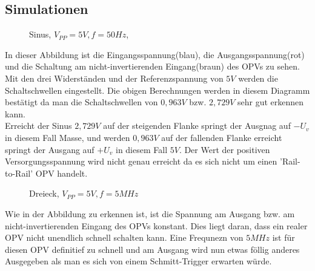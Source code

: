 \subsection{Simulationen}
\begin{figure}[H]
  \centering
  \caption{Sinus, $V_{PP}=5V, f=50Hz$,}
\end{figure}
\noindent
In dieser Abbildung ist die Eingangsspannung(blau), die Ausgangsspannung(rot) und die Schaltung am nicht-invertierenden Eingang(braun) des OPVs zu sehen. Mit den drei Widerst\"anden und der Referenzspannung von $5V$ werden die Schaltschwellen eingestellt. Die obigen Berechnungen werden in diesem Diagramm best\"atigt da man die Schaltschwellen von $0,963V$ bzw. $2,729V$ sehr gut erkennen kann. \\
Erreicht der Sinus $2,729V$ auf der steigenden Flanke springt der Ausgnag auf $-U_v$ in diesem Fall Masse, und werden $0,963V$ auf der fallenden Flanke erreicht springt der Ausgang auf $+U_v$ in diesem Fall $5V$. Der Wert der positiven Versorgungsspannung wird nicht genau erreicht da es sich nicht um einen 'Rail-to-Rail' OPV handelt.

\begin{figure}[H]
  \centering
  \caption{Dreieck, $V_{PP}=5V, f=5MHz$}
\end{figure}
\noindent
Wie in der Abbildung zu erkennen ist, ist die Spannung am Ausgang bzw. am nicht-invertierenden Eingang des OPVs konstant. Dies liegt daran, dass ein realer OPV nicht unendlich schnell schalten kann. Eine Frequnezn von $5MHz$ ist f\"ur diesen OPV definitief zu schnell und am Ausgang wird nun etwas f\"ollig anderes Ausgegeben als man es sich von einem Schmitt-Trigger erwarten w\"urde.
